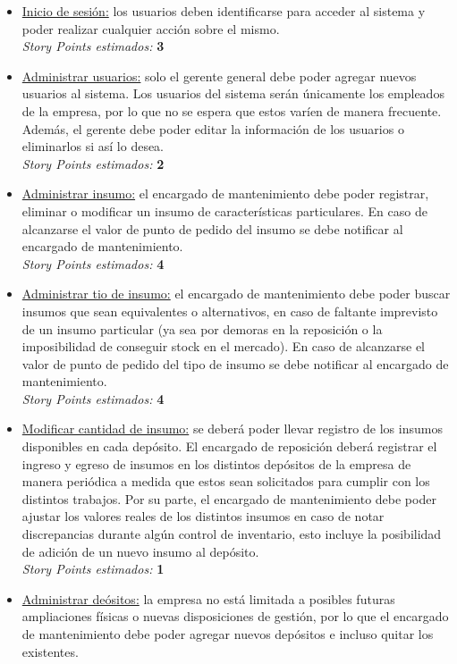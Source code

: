 \documentclass[a4paper, 12pt,twoside]{report}  %
\numberwithin{equation}{subsection} %
\begin{document}
\begin{itemize}
	\item \underline{Inicio de sesión:} los usuarios deben identificarse para acceder al sistema y poder realizar cualquier acción sobre el mismo.\\
	\textit{Story Points estimados:} \textbf{3}
	\item \underline{Administrar usuarios:} solo el gerente general debe poder agregar nuevos usuarios al sistema. Los usuarios del sistema serán únicamente los empleados de la empresa, por lo que no se espera que estos varíen de manera frecuente. Además, el gerente debe poder editar la información de los usuarios o eliminarlos  si así lo desea.\\
	\textit{Story Points estimados:} \textbf{2}
	\item \underline{Administrar insumo:} el encargado de mantenimiento debe poder registrar, eliminar o modificar un insumo de características particulares. En caso de alcanzarse el valor de punto de pedido del insumo se debe notificar al encargado de mantenimiento.\\
	\textit{Story Points estimados:} \textbf{4}
	\item \underline{Administrar tio de insumo:} el encargado de mantenimiento debe poder buscar insumos que sean equivalentes o alternativos, en caso de faltante imprevisto de un insumo particular (ya sea por demoras en la reposición o la imposibilidad de conseguir stock en el mercado). En caso de alcanzarse el valor de punto de pedido del tipo de insumo se debe notificar al encargado de mantenimiento.\\
	\textit{Story Points estimados:} \textbf{4}
	\item \underline{Modificar cantidad de insumo:} se deberá poder llevar registro de los insumos disponibles en cada depósito. El encargado de reposición deberá registrar el ingreso y egreso de insumos en los distintos depósitos de la empresa de manera periódica a medida que estos sean solicitados para cumplir con los distintos trabajos. Por su parte, el encargado de mantenimiento debe poder ajustar los valores reales de los distintos insumos en caso de notar discrepancias durante algún control de inventario, esto incluye la posibilidad de adición de un nuevo insumo al depósito.\\
	\textit{Story Points estimados:} \textbf{1}
	\item \underline{Administrar deósitos:} la empresa no está limitada a posibles futuras ampliaciones físicas o nuevas disposiciones de gestión, por lo que el encargado de mantenimiento debe poder agregar nuevos depósitos e incluso quitar los existentes.\\

\end{itemize}
\end{document}

